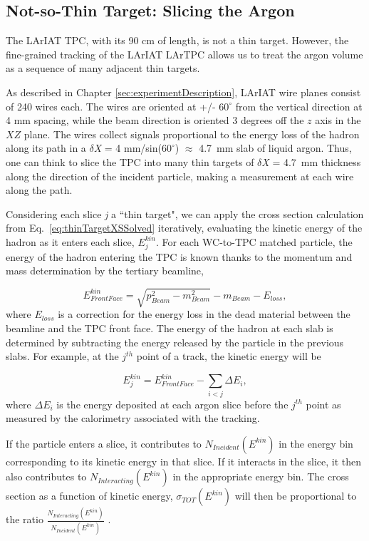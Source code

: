 \subsection{Not-so-Thin Target: Slicing the Argon}
The LArIAT TPC, with its 90 cm of length, is not a thin target. However, the fine-grained tracking of the LArIAT LArTPC allows us to treat the argon volume as a sequence of many adjacent thin targets. 

As described in Chapter \ref{sec:experimentDescription}, LArIAT wire planes consist of 240 wires each. The wires are oriented at +/- $60^{\circ}$ from the vertical direction at 4 mm spacing, while the beam direction is oriented 3 degrees off the $z$ axis in the $XZ$ plane.  The wires collect signals proportional to the energy loss of the hadron along its path in a  $\delta${\emph{X}} = 4 mm/sin($60^{\circ}$) $\approx$ 4.7~mm slab of liquid argon. Thus, one can think to slice the TPC into many thin targets of $\delta${\emph{X}} = 4.7~mm thickness along the direction of the incident particle, making a measurement at each wire along the path.

Considering each slice {\emph{j}}  a ``thin target",  we can apply the cross section calculation from Eq.~\ref{eq:thinTargetXSSolved} iteratively, evaluating the kinetic energy of the hadron as it enters each slice, $E_{j}^{kin}$.  For each WC-to-TPC matched particle, the energy of the hadron entering the TPC is known thanks to the momentum and mass determination by the tertiary beamline, 

\begin{equation}
 E^{kin}_{Front Face}  = \sqrt{p^2_{Beam} - m^2_{Beam}} - m_{Beam} - E_{loss},
\label{eq:enFF}
\end{equation}
where $E_{loss}$ is a correction for the energy loss in the dead material between the beamline and the TPC front face. The  energy of the hadron at each slab is determined by subtracting the energy released by the particle in the previous slabs. For example, at the $j^{th}$ point of a track, the kinetic energy will be

\begin{equation}
 E_{j}^{kin} =  E^{kin}_{Front Face} - \sum_{i < j} \Delta E_i,
\label{eq:KEj}
\end{equation}
where $\Delta E_i$ is the energy deposited at each argon slice before the $j^{th}$ point as measured by the calorimetry associated with the tracking.


If the particle enters a slice, it contributes to $N_{Incident}( E^{kin})$ in the energy bin corresponding to its kinetic energy in that slice. If it interacts in the slice, it then also contributes to $N_{Interacting}(E^{kin})$ in the appropriate energy bin. The cross section as a function of kinetic energy, $\sigma_{TOT}( E^{kin})$ will then be proportional to the ratio $\frac{N_{Interacting}( E^{kin})}{N_{Incident}( E^{kin})}$ .


